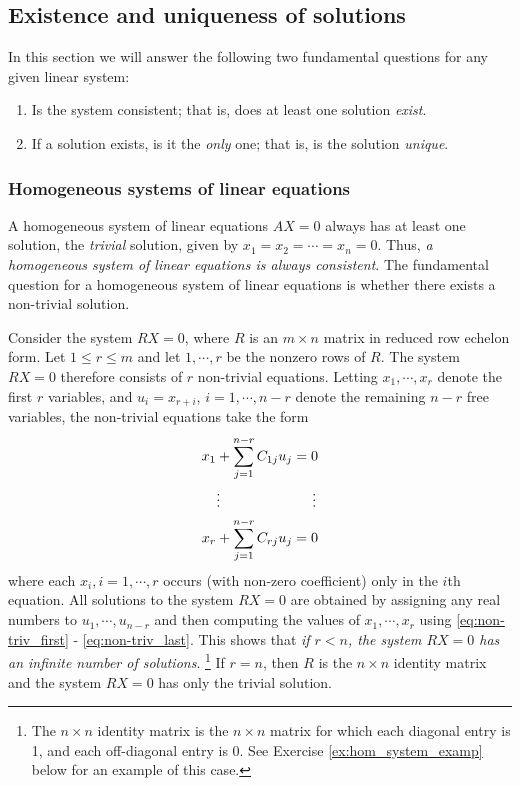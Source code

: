 \documentclass[12pt,letterpaper,reqno]{article}
\numberwithin{equation}{section}
\newcommand{\ti}[1]{\textit{#1}}
\begin{document}
\subsection{Existence and uniqueness of solutions}
In this section we will answer the following two fundamental questions for any given linear system:
\begin{enumerate}
	\item Is the system consistent; that is, does at least one solution \ti{exist}.
	\item If a solution exists, is it the \ti{only} one; that is, is the solution \ti{unique}.
\end{enumerate}
\subsubsection{Homogeneous systems of linear equations}
A homogeneous system of linear equations $AX=0$ always has at least one solution, the \ti{trivial} solution, given by $x_1=x_2=\cdots=x_n=0$. Thus, \ti{a homogeneous system of linear equations is always consistent}. The fundamental question for a homogeneous system of linear equations is whether there exists a non-trivial solution.

Consider the system $RX=0$, where $R$ is an $m \times n$ matrix in reduced row echelon form. Let $1 \leq r \leq m$ and let $1,\cdots,r$ be the nonzero rows of $R$. The system $RX=0$ therefore consists of $r$ non-trivial equations. Letting $x_1,\cdots,x_r$ denote the first $r$ variables, and $u_i=x_{r+i}$, $i=1,\cdots,n-r$ denote the remaining $n-r$ free variables, the non-trivial equations take the form
\begin{align}
		x_1+\sum_{j=1}^{n-r}C_{1j}u_j&=0 \label{eq:non-triv_first} \\
		\vdots \hspace{1.8cm}& \hspace{0.5cm}\vdots \\
		x_r+\sum_{j=1}^{n-r}C_{rj}u_j&=0 \label{eq:non-triv_last}
	\end{align}
where each $x_i, i=1,\cdots,r$ occurs (with non-zero coefficient) only in the $i$th equation. All solutions to the system $RX=0$ are obtained by assigning any real numbers to $u_1,\cdots, u_{n-r}$ and then computing the values of $x_1,\cdots, x_r$ using \eqref{eq:non-triv_first} - \eqref{eq:non-triv_last}. This shows that \ti{if $r<n$, the system $RX=0$ has an infinite number of solutions}. \footnote{The $n \times n$ identity matrix is the $n \times n$ matrix for which each diagonal entry is 1, and each off-diagonal entry is 0. See Exercise \ref{ex:hom_system_examp} below for an example of this case.} If $r=n$, then $R$ is the $n \times n$ identity matrix and the system $RX=0$ has only the trivial solution. 
\end{document}
